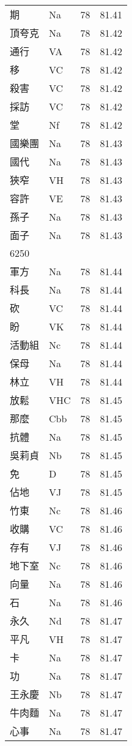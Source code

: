 \documentclass[twocolumn]{book}
\begin{document}
\begin{supertabular}{llrr}
期 & Na & 78 &  81.41\\
頂夸克 & Na & 78 &  81.42\\
通行 & VA & 78 &  81.42\\
移 & VC & 78 &  81.42\\
殺害 & VC & 78 &  81.42\\
採訪 & VC & 78 &  81.42\\
堂 & Nf & 78 &  81.42\\
國樂團 & Na & 78 &  81.43\\
國代 & Na & 78 &  81.43\\
狹窄 & VH & 78 &  81.43\\
容許 & VE & 78 &  81.43\\
孫子 & Na & 78 &  81.43\\
面子 & Na & 78 &  81.43\\
6250\\
軍方 & Na & 78 &  81.44\\
科長 & Na & 78 &  81.44\\
砍 & VC & 78 &  81.44\\
盼 & VK & 78 &  81.44\\
活動組 & Nc & 78 &  81.44\\
保母 & Na & 78 &  81.44\\
林立 & VH & 78 &  81.44\\
放鬆 & VHC & 78 &  81.45\\
那麼 & Cbb & 78 &  81.45\\
抗體 & Na & 78 &  81.45\\
吳莉貞 & Nb & 78 &  81.45\\
免 & D & 78 &  81.45\\
佔地 & VJ & 78 &  81.45\\
竹東 & Nc & 78 &  81.46\\
收購 & VC & 78 &  81.46\\
存有 & VJ & 78 &  81.46\\
地下室 & Nc & 78 &  81.46\\
向量 & Na & 78 &  81.46\\
石 & Na & 78 &  81.46\\
永久 & Nd & 78 &  81.47\\
平凡 & VH & 78 &  81.47\\
卡 & Na & 78 &  81.47\\
功 & Na & 78 &  81.47\\
王永慶 & Nb & 78 &  81.47\\
牛肉麵 & Na & 78 &  81.47\\
心事 & Na & 78 &  81.47\\

\end{supertabular}
\end{document}

